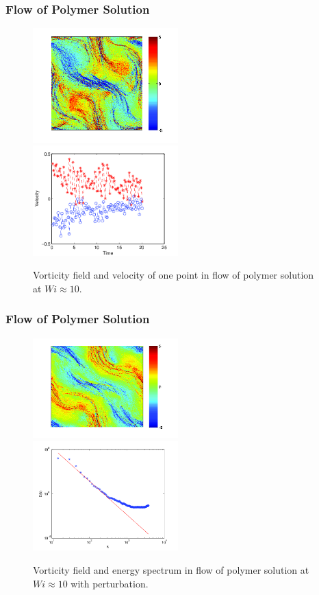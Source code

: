 \begin{frame}
  \frametitle{Flow of Polymer Solution}
  \begin{figure}[ht]
    \centering
    \includegraphics[width=0.5\textwidth]{img/polymer_loc-14.png}
    \includegraphics[width=0.5\textwidth]{img/polymer_loc-8.png}
    \caption{Vorticity field and velocity of one point in flow of polymer solution at $Wi\approx10$.}
    \label{fig:vor_pol10}
  \end{figure}
\end{frame}

\begin{frame}
 \frametitle{Flow of Polymer Solution}
  \begin{figure}[t]
    \centering
    \includegraphics[width=0.5\textwidth]{img/polymer_loc-11.png}
 \includegraphics[width=0.5\textwidth]{img/polymer_loc-0.png}
    \caption{Vorticity field and energy spectrum in flow of polymer solution at $Wi\approx10$ with perturbation.}
    \label{fig:vor_per}
  \end{figure}
\end{frame}

